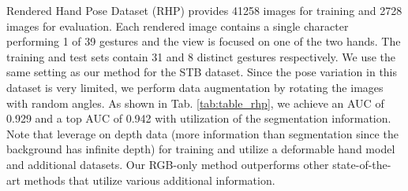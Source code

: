 \documentclass[10pt,twocolumn,letterpaper]{article}
\begin{document}
\indent Rendered Hand Pose Dataset (RHP) provides 41258 images for training and 2728 images for evaluation. Each rendered image contains a single character performing 1 of 39 gestures and the view is focused on one of the two hands. The training and test sets contain 31 and 8 distinct gestures respectively. We use the same setting as our method for the STB dataset. Since the pose variation in this dataset is very limited, we perform data augmentation by rotating the images with random angles. As shown in Tab. \ref{tab:table_rhp}, we achieve an AUC of 0.929 and a top AUC of 0.942 with utilization of the segmentation information. Note that \cite{Iqbal,Cai} leverage on depth data (more information than segmentation since the background has infinite depth) for training and \cite{Ge2,Baek} utilize a deformable hand model and additional datasets. Our RGB-only method outperforms other state-of-the-art methods that utilize various additional information.
\end{document}
